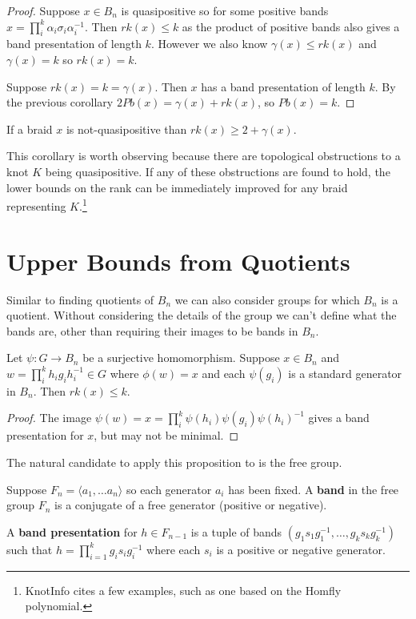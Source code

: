 \documentclass[12pt]{thesis}
\begin{document}
\begin{proof}

    Suppose $x \in B_{n}$ is quasipositive
    so for some positive bands $x = \prod_{i}^{k} \alpha_{i} \sigma_{i} \alpha_{i}^{-1}$.
    Then $rk(x) \leq k$ as the product of positive bands also gives a band presentation of length $k$.
    However we also know $\gamma(x) \leq rk(x)$ and $\gamma(x) = k$ so 
    $rk(x) = k$.

    Suppose $rk(x) = k = \gamma(x)$. Then $x$ has a band presentation of length $k$.
    By the previous corollary $2Pb(x) = \gamma(x) + rk(x)$,
    so $Pb(x) = k$.
\end{proof}

\begin{corollary}
    If a braid $x$ is not-quasipositive than $rk(x) \geq 2 + \gamma(x)$.
\end{corollary}

This corollary is worth observing because there are topological obstructions
to a knot $K$ being quasipositive.
If any of these obstructions are found to hold, the lower bounds
on the rank can be immediately improved for any braid
representing $K$.\footnote{ KnotInfo\cite{knotinfo} cites a few examples,
such as one based on the Homfly polynomial. }

\section{Upper Bounds from Quotients}

Similar to finding quotients of $B_{n}$
we can also consider groups for which $B_{n}$ is a quotient.
Without considering the details of the group
we can't define what the bands are,
other than requiring their images
to be bands in $B_{n}$.

\begin{proposition}
    \label{prop:upper-bounds-from-quotient}
    Let $\psi \colon G \rightarrow B_{n}$ be a surjective homomorphism.
    Suppose $x \in B_{n}$ and $w = \prod_{i}^{k} h_{i}g_{i}h_{i}^{-1} \in G$
    where $\phi(w) = x$
    and each $\psi(g_{i})$ is a standard
    generator in $B_{n}$. 
    Then $rk(x) \leq k$.
\end{proposition}
\begin{proof}
    The image $\psi(w) = x = \prod_{i}^{k} \psi(h_{i}) \psi(g_{i}) \psi(h_{i})^{-1}$
    gives a band presentation for $x$, but may not be minimal.
\end{proof}

The natural candidate to apply this proposition to is the free group.
\begin{definition}
    Suppose $F_{n} = \langle a_{1}, \ldots a_{n} \rangle$
    so each generator $a_{i}$ has been fixed.
    A \textbf{band} in the free group $F_{n}$ is a conjugate
    of a free generator (positive or negative).
\end{definition}
\begin{definition}
    A \textbf{band presentation} for $h \in F_{n-1}$ is a 
    tuple of bands $(g_{1}s_{1}g_{1}^{-1}, \ldots, g_{k}s_{k}g_{k}^{-1})$
    such that $h = \prod_{i=1}^{k} g_{i}s_{i}g_{i}^{-1}$
    where each $s_{i}$ is a positive or negative generator.
\end{definition}
\end{document}
